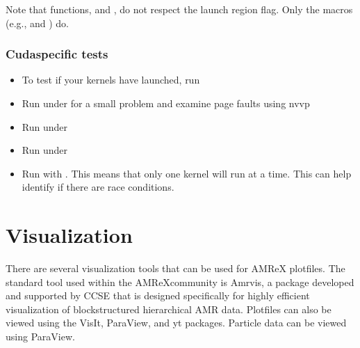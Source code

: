 \documentclass[letterpaper,10pt,english]{sphinxmanual}
\begin{document}
\sphinxAtStartPar
Note that functions,  and , do
not respect the launch region flag.  Only the macros (e.g.,
 and ) do.


\subsection{Cuda\sphinxhyphen{}specific tests}
\label{\detokenize{GPU:cuda-specific-tests}}\begin{itemize}
\item {} 
\sphinxAtStartPar
To test if your kernels have launched, run

\end{itemize}

\begin{sphinxVerbatim}[commandchars=\\\{\}]
 
\end{sphinxVerbatim}
\begin{itemize}
\item {} 
\sphinxAtStartPar
Run under  for
a small problem and examine page faults using nvvp

\item {} 
\sphinxAtStartPar
Run under 

\item {} 
\sphinxAtStartPar
Run under 

\item {} 
\sphinxAtStartPar
Run with .  This means that only one
kernel will run at a time.  This can help identify if there are race
conditions.

\end{itemize}


\chapter{Visualization}
\label{\detokenize{Visualization_Chapter:visualization}}\label{\detokenize{Visualization_Chapter:chap-visualization}}\label{\detokenize{Visualization_Chapter::doc}}
\sphinxAtStartPar
There are several visualization tools that can be used for AMReX plotfiles. The
standard tool used within the AMReX\sphinxhyphen{}community is Amrvis, a package developed
and supported by CCSE that is designed specifically for highly efficient
visualization of block\sphinxhyphen{}structured hierarchical AMR data. Plotfiles can also be
viewed using the VisIt, ParaView, and yt packages. Particle data can be viewed
using ParaView.
\end{document}
